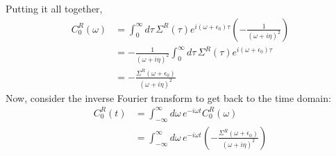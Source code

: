 Putting it all together,
\begin{align}
    C^{R}_0(\omega) &= \int_0^\infty d\tau\, \Sigma^R(\tau) e^{i(\omega+\epsilon_0)\tau} \left(-\frac{1}{(\omega + i\eta)^2}\right) \\
    &= -\frac{1}{(\omega + i\eta)^2} \int_0^\infty d\tau\, \Sigma^R(\tau) e^{i(\omega+\epsilon_0)\tau} \\
    &= -\frac{\Sigma^R(\omega+\epsilon_0)}{(\omega + i\eta)^2} 
\end{align}
Now, consider the inverse Fourier transform to get back to the time domain:
\begin{align}
    C^{R}_0(t) &= \int_{-\infty}^{\infty} d\omega\, e^{-i\omega t} C^{R}_0(\omega) \\
    &= \int_{-\infty}^{\infty} d\omega\, e^{-i\omega t} \left(-\frac{\Sigma^R(\omega+\epsilon_0)}{(\omega + i\eta)^2}\right)
\end{align}
